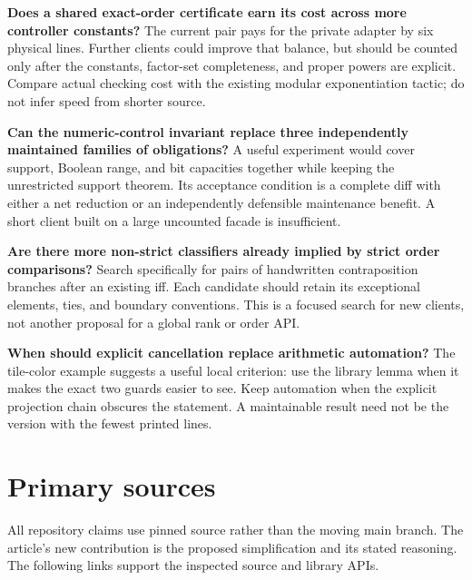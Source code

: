 \documentclass[11pt]{article}
\begin{document}
\textbf{Does a shared exact-order certificate earn its cost across more
controller constants?} The current pair pays for the private adapter by six
physical lines. Further clients could improve that balance, but should be
counted only after the constants, factor-set completeness, and proper powers
are explicit. Compare actual checking cost with the existing modular
exponentiation tactic; do not infer speed from shorter source.

\textbf{Can the numeric-control invariant replace three independently
maintained families of obligations?} A useful experiment would cover support,
Boolean range, and bit capacities together while keeping the unrestricted
support theorem. Its acceptance condition is a complete diff with either a
net reduction or an independently defensible maintenance benefit. A short
client built on a large uncounted facade is insufficient.

\textbf{Are there more non-strict classifiers already implied by strict
order comparisons?} Search specifically for pairs of handwritten
contraposition branches after an existing iff. Each candidate should retain
its exceptional elements, ties, and boundary conventions. This is a focused
search for new clients, not another proposal for a global rank or order API.

\textbf{When should explicit cancellation replace arithmetic automation?}
The tile-color example suggests a useful local criterion: use the library
lemma when it makes the exact two guards easier to see. Keep automation when
the explicit projection chain obscures the statement. A maintainable result
need not be the version with the fewest printed lines.

\appendix
\section{Primary sources}

All repository claims use pinned source rather than the moving main branch.
The article's new contribution is the proposed simplification and its stated
reasoning. The following links support the inspected source and library APIs.
\end{document}
